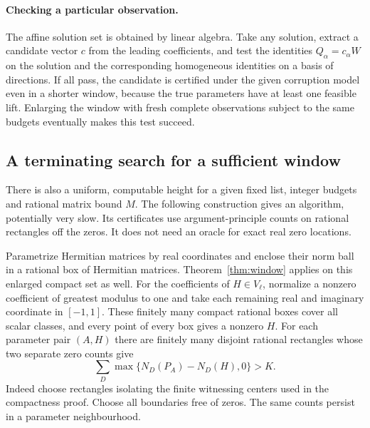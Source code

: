 \documentclass[11pt]{article}
\theoremstyle{remark}\newtheorem{remark}[theorem]{Remark}
\begin{document}
\paragraph{Checking a particular observation.}
The affine solution set is obtained by linear algebra. Take any solution, extract a candidate vector $c$ from the leading coefficients, and test the identities $Q_\alpha=c_\alpha W$ on the solution and the corresponding homogeneous identities on a basis of directions. If all pass, the candidate is certified under the given corruption model even in a shorter window, because the true parameters have at least one feasible lift. Enlarging the window with fresh complete observations subject to the same budgets eventually makes this test succeed.

\subsection*{A terminating search for a sufficient window}
There is also a uniform, computable height for a given fixed list, integer budgets and rational matrix bound $M$. The following construction gives an algorithm, potentially very slow. Its certificates use argument-principle counts on rational rectangles off the zeros. It does not need an oracle for exact real zero locations.

Parametrize Hermitian matrices by real coordinates and enclose their norm ball in a rational box of Hermitian matrices. Theorem~\ref{thm:window} applies on this enlarged compact set as well. For the coefficients of $H\in V_\ell$, normalize a nonzero coefficient of greatest modulus to one and take each remaining real and imaginary coordinate in $[-1,1]$. These finitely many compact rational boxes cover all scalar classes, and every point of every box gives a nonzero $H$. For each parameter pair $(A,H)$ there are finitely many disjoint rational rectangles whose two separate zero counts give
\[
 \sum_D \max\{N_D(P_A)-N_D(H),0\}>K .
\]
Indeed choose rectangles isolating the finite witnessing centers used in the compactness proof. Choose all boundaries free of zeros. The same counts persist in a parameter neighbourhood.
\end{document}
